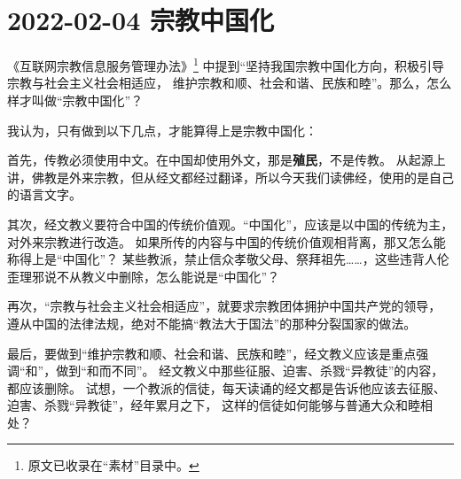 \section{2022-02-04 宗教中国化}

《互联网宗教信息服务管理办法》\footnote{原文已收录在“素材”目录中。} 中提到“坚持我国宗教中国化方向，积极引导宗教与社会主义社会相适应，
维护宗教和顺、社会和谐、民族和睦”。那么，怎么样才叫做“宗教中国化”？

我认为，只有做到以下几点，才能算得上是宗教中国化：

首先，传教必须使用中文。在中国却使用外文，那是\textbf{\color{red}殖民}，不是传教。
从起源上讲，佛教是外来宗教，但从经文都经过翻译，所以今天我们读佛经，使用的是自己的语言文字。

其次，经文教义要符合中国的传统价值观。“中国化”，应该是以中国的传统为主，对外来宗教进行改造。
如果所传的内容与中国的传统价值观相背离，那又怎么能称得上是“中国化”？
某些教派，禁止信众孝敬父母、祭拜祖先……，这些违背人伦歪理邪说不从教义中删除，怎么能说是“中国化”？

再次，“宗教与社会主义社会相适应”，就要求宗教团体拥护中国共产党的领导，
遵从中国的法律法规，绝对不能搞“教法大于国法”的那种分裂国家的做法。

最后，要做到“维护宗教和顺、社会和谐、民族和睦”，经文教义应该是重点强调“和”，做到“和而不同”。
经文教义中那些征服、迫害、杀戮“异教徒”的内容，都应该删除。
试想，一个教派的信徒，每天读诵的经文都是告诉他应该去征服、迫害、杀戮“异教徒”，经年累月之下，
这样的信徒如何能够与普通大众和睦相处？

